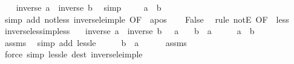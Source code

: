 \begin{isabellebody}
\ \ \isamarkupfalse%
\ {\isachardoublequoteopen}inverse\ a\ {\isasymle}\ inverse\ b{\isachardoublequoteclose}\ \isamarkupfalse%
\ simp\isanewline
\ \ \isamarkupfalse%
\ {\isachardoublequoteopen}{\isasymnot}\ {\isacharparenleft}{\kern0pt}a\ {\isacharless}{\kern0pt}\ b{\isacharparenright}{\kern0pt}{\isachardoublequoteclose}\isanewline
\ \ \ \ \isamarkupfalse%
\ {\isacharparenleft}{\kern0pt}simp\ add{\isacharcolon}{\kern0pt}\ not{\isacharunderscore}{\kern0pt}less\ inverse{\isacharunderscore}{\kern0pt}le{\isacharunderscore}{\kern0pt}imp{\isacharunderscore}{\kern0pt}le\ {\isacharbrackleft}{\kern0pt}OF\ {\isacharunderscore}{\kern0pt}\ apos{\isacharbrackright}{\kern0pt}{\isacharparenright}{\kern0pt}\isanewline
\ \ \isamarkupfalse%
\ False\ \isamarkupfalse%
\ {\isacharparenleft}{\kern0pt}rule\ notE\ {\isacharbrackleft}{\kern0pt}OF\ {\isacharunderscore}{\kern0pt}\ less{\isacharbrackright}{\kern0pt}{\isacharparenright}{\kern0pt}\isanewline
{}\isamarkupfalse%
%
\endisatagproof
{\isafoldproof}%
%
\isadelimproof
\isanewline
%
\endisadelimproof
\isanewline
{}\isamarkupfalse%
\ inverse{\isacharunderscore}{\kern0pt}less{\isacharunderscore}{\kern0pt}imp{\isacharunderscore}{\kern0pt}less{\isacharcolon}{\kern0pt}\isanewline
\ \ \ {\isachardoublequoteopen}inverse\ a\ {\isacharless}{\kern0pt}\ inverse\ b{\isachardoublequoteclose}\ {\isachardoublequoteopen}{}\ {\isacharless}{\kern0pt}\ a{\isachardoublequoteclose}\isanewline
\ \ \ {\isachardoublequoteopen}b\ {\isacharless}{\kern0pt}\ a{\isachardoublequoteclose}\isanewline
%
\isadelimproof
%
\endisadelimproof
%
\isatagproof
{}\isamarkupfalse%
\ {\isacharminus}{\kern0pt}\isanewline
\ \ \isamarkupfalse%
\ {\isachardoublequoteopen}a\ {\isasymnoteq}\ b{\isachardoublequoteclose}\isanewline
\ \ \ \ \isamarkupfalse%
\ assms\ \isamarkupfalse%
\ {\isacharparenleft}{\kern0pt}simp\ add{\isacharcolon}{\kern0pt}\ less{\isacharunderscore}{\kern0pt}le{\isacharparenright}{\kern0pt}\isanewline
\ \ \isamarkupfalse%
\ \isamarkupfalse%
\ {\isachardoublequoteopen}b\ {\isasymle}\ a{\isachardoublequoteclose}\isanewline
\ \ \ \ \isamarkupfalse%
\ assms\ \isamarkupfalse%
\ {\isacharparenleft}{\kern0pt}force\ simp{\isacharcolon}{\kern0pt}\ less{\isacharunderscore}{\kern0pt}le\ dest{\isacharcolon}{\kern0pt}\ inverse{\isacharunderscore}{\kern0pt}le{\isacharunderscore}{\kern0pt}imp{\isacharunderscore}{\kern0pt}le{\isacharparenright}{\kern0pt}\isanewline

\end{isabellebody}
